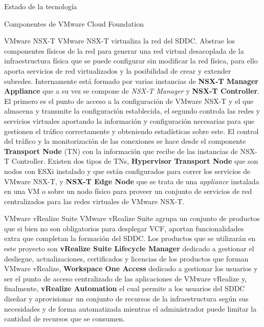 \begin{section}{Estado de la tecnología}
\begin{subsection}{Componentes de VMware Cloud Foundation \cite{componentesCloudFound}}
\begin{subsubsection}{VMware NSX-T}
    VMware NSX-T virtualiza la red del SDDC. Abstrae los componentes físicos de la red para generar una red virtual desacoplada de la infraestructura física que se puede configurar sin modificar la red física, para ello aporta servicios de red virtualizados y la posibilidad de crear y extender subredes. Internamente está formado por varias instancias de \textbf{NSX-T Manager Appliance} que a su vez se compone de \textit{NSX-T Manager} y \textbf{NSX-T Controller}. El primero es el punto de acceso a la configuración de VMware NSX-T y el que almacena y transmite la configuración establecida, el segundo controla las redes y servicios virtuales aportando la información y configuración necesarias para que gestionen el tráfico correctamente y obteniendo estadísticas sobre este. El control del tráfico y la monitorización de las conexiones se hace desde el componente \textbf{Transport Node} (TN) con la información que recibe de las instancias de NSX-T Controller. Existen dos tipos de TNs, \textbf{Hypervisor Transport Node} que son nodos con ESXi instalado y que están configurados para correr los servicios de VMware NSX-T, y \textbf{NSX-T Edge Node} que se trata de una \textit{appliance} instalada en una VM o sobre un nodo físico para proveer un conjunto de servicios de red centralizados para las redes virtuales de VMware NSX-T.
\end{subsubsection}

\begin{subsubsection}{VMware vRealize Suite}
    VMware vRealize Suite agrupa un conjunto de productos que si bien no son obligatorios para desplegar VCF, aportan funcionalidades extra que completan la formación del SDDC. Los productos que se utilizarán en este proyecto son \textbf{vRealize Suite Lifecycle Manager} dedicado a gestionar el desliegue, actualizaciones, certificados y licencias de los productos que forman VMware vRealize, \textbf{Workspace One Access} dedicado a gestionar los usuarios y ser el punto de acceso centralizado de las aplicaciones de VMware vRealize y, finalmente, \textbf{vRealize Automation} el cual permite a los usuarios del SDDC diseñar y aprovisionar un conjunto de recursos de la infraestructura según sus necesidades y de forma automatizada mientras el administrador puede limitar la cantidad de recursos que se consumen.
\end{subsubsection}

\end{subsection}

\end{section}
